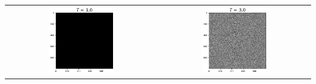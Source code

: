 \begin{frame}
\begin{columns}
\begin{column}{0.45\textwidth}
            \begin{tabular}{cc}
                \includegraphics[width=0.45\textwidth]{Immagini/Introduzione/cg_1000_1.0.png} &
                \includegraphics[width=0.45\textwidth]{Immagini/Introduzione/cg_1000_3.0.png} \\
            \end{tabular}
        
        \end{column}
      \end{columns}
  
\end{frame}
